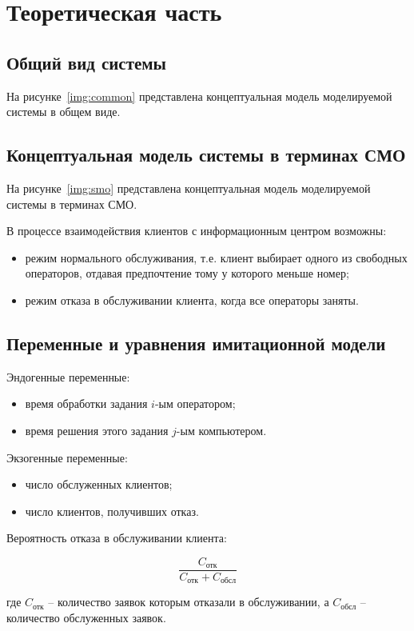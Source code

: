 \chapter{Теоретическая часть}

\section{Общий вид системы}

На рисунке~\ref{img:common} представлена концептуальная модель моделируемой     системы в общем виде.


\section{Концептуальная модель системы в терминах СМО}

На рисунке~\ref{img:smo} представлена концептуальная модель моделируемой системы в терминах СМО.


В процессе взаимодействия клиентов с информационным центром
возможны:
\begin{itemize}
    \item режим нормального обслуживания, т.е. клиент выбирает одного из
свободных операторов, отдавая предпочтение тому у которого меньше номер;
    \item режим отказа в обслуживании клиента, когда все операторы заняты.
\end{itemize}

\section{Переменные и уравнения имитационной модели}

Эндогенные переменные: 
\begin{itemize}
    \item время обработки задания $i$-ым оператором;
    \item время решения этого задания $j$-ым компьютером.
\end{itemize}

Экзогенные переменные: 
\begin{itemize}
    \item число обслуженных клиентов;
    \item число клиентов, получивших отказ.
\end{itemize}

Вероятность отказа в обслуживании клиента: 

$$\frac{C_{\text{отк}}}{C_{\text{отк}} + C_{\text{обсл}}}$$

где $C_{\text{отк}}$ -- количество заявок которым отказали в обслуживании, а $C_{\text{обсл}}$ -- количество обслуженных заявок.

